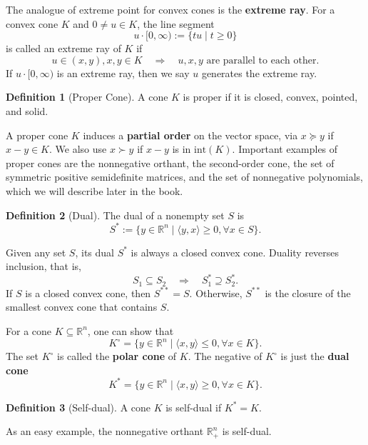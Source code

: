 \documentclass[
]{book}
\theoremstyle{definition}
\newtheorem{definition}{Definition}[chapter]
\theoremstyle{definition}
\theoremstyle{definition}
\theoremstyle{definition}
\theoremstyle{remark}
\begin{document}
The analogue of extreme point for convex cones is the \textbf{extreme ray}. For a convex cone \(K\) and \(0 \neq u \in K\), the line segment
\[
u \cdot [0,\infty) := \{ tu \mid t\geq 0 \}
\]
is called an extreme ray of \(K\) if
\[
u \in (x,y), x,y \in K \quad \Rightarrow \quad u,x,y \text{ are parallel to each other}.
\]
If \(u \cdot [0,\infty)\) is an extreme ray, then we say \(u\) generates the extreme ray.

\begin{definition}[Proper Cone]
\protect\hypertarget{def:ProperCone}{}\label{def:ProperCone}A cone \(K\) is proper if it is closed, convex, pointed, and solid.
\end{definition}

A proper cone \(K\) induces a \textbf{partial order} on the vector space, via \(x \succeq y\) if \(x - y \in K\). We also use \(x \succ y\) if \(x - y\) is in \(\mathrm{int}(K)\). Important examples of proper cones are the nonnegative orthant, the second-order cone, the set of symmetric positive semidefinite matrices, and the set of nonnegative polynomials, which we will describe later in the book.

\begin{definition}[Dual]
\protect\hypertarget{def:Dual}{}\label{def:Dual}The dual of a nonempty set \(S\) is
\[
S^* := \{  y \in \mathbb{R}^{n} \mid \langle y, x \rangle \geq 0, \forall x \in S \}.
\]
\end{definition}

Given any set \(S\), its dual \(S^*\) is always a closed convex cone. Duality reverses inclusion, that is,
\[
S_1 \subseteq S_2 \quad \Rightarrow \quad S_1^* \supseteq S_2^*.
\]
If \(S\) is a closed convex cone, then \(S^{* *}= S\). Otherwise, \(S^{* *}\) is the closure of the smallest convex cone that contains \(S\).

For a cone \(K \subseteq \mathbb{R}^{n}\), one can show that
\[
K^\circ = \{ y \in \mathbb{R}^{n} \mid \langle x, y \rangle \leq 0, \forall x \in K \}.
\]
The set \(K^\circ\) is called the \textbf{polar cone} of \(K\). The negative of \(K^\circ\) is just the \textbf{dual cone}
\[
K^{*} = \{ y \in \mathbb{R}^{n} \mid \langle x, y \rangle \geq 0, \forall x \in K \}.
\]

\begin{definition}[Self-dual]
\protect\hypertarget{def:selfdual}{}\label{def:selfdual}A cone \(K\) is self-dual if \(K^{*} = K\).
\end{definition}

As an easy example, the nonnegative orthant \(\mathbb{R}^{n}_{+}\) is self-dual.
\end{document}
